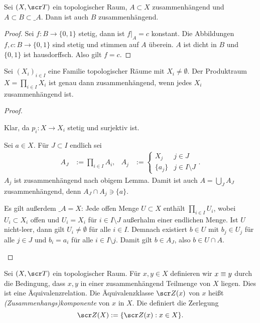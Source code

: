 \begin{lem}
	Sei $(X, \scr T)$ ein topologischer Raum, $A \subset X$ zusammenhängend und $A \subset B \subset \_A$.
	Dann ist auch $B$ zusammenhängend.
	\begin{proof}
		Sei $f: B \to \{0,1\}$ stetig, dann ist $f|_A = c$ konstant.
		Die Abbildungen $f, c: B \to \{0,1\}$ sind stetig und stimmen auf $A$ überein.
		$A$ ist dicht in $B$ und $\{0,1\}$ ist hausdorffsch.
		Also gilt $f=c$.
	\end{proof}
\end{lem}

\begin{st}
	Sei $(X_i)_{i\in I}$ eine Familie topologischer Räume mit $X_i \neq \emptyset$.
	Der Produktraum $X = \prod_{i\in I} X_i$ ist genau dann zusammenhängend, wenn jedes $X_i$ zusammenhängend ist.
	\begin{proof}
		\begin{segnb}[„$\implies$“]
			Klar, da $p_i: X \to X_i$ stetig und surjektiv ist.
		\end{segnb}
		\begin{segnb}[„$\implies$“]
			Sei $a \in X$.
			Für $J \subset I$ endlich sei
			\begin{align*}
				A_J &:= \prod_{i\in I} A_i, &
				A_j &:= \begin{cases}
					X_j & j \in J \\
					\{a_j\} & j \in I \setminus J
				\end{cases}.
			\end{align*}
			$A_j$ ist zusammenhängend nach obigem Lemma.
			Damit ist auch $A = \bigcup_{J} A_J$ zusammenhängend, denn $A_J \cap A_j \ni \{a\}$.

			Es gilt außerdem $\_A = X$:
			Jede offen Menge $U \subset X$ enthält $\prod_{i \in I} U_i$, wobei $U_i \subset X_i$ offen und $U_i = X_i$ für $i \in I \setminus J$ außerhalm einer endlichen Menge.
			Ist $U$ nicht-leer, dann gilt $U_i \neq \emptyset$ für alle $i \in I$.
			Demnach existiert $b \in U$ mit $b_j \in U_j$ für alle $j \in J$ und $b_i = a_i$ für alle $i \in I \setminus j$.
			Damit gilt $b \in A_J$, also $b \in U \cap A$.
		\end{segnb}
	\end{proof}
\end{st}

\begin{df}
	Sei $(X, \scr T)$ ein topologischer Raum.
	Für $x,y \in X$ definieren wir $x \equiv y$ durch die Bedingung, dass $x,y$ in einer zusammenhängend Teilmenge von $X$ liegen.
	Dies ist eine Äquivalenzrelation.
	Die Äquivalenzklasse $\scr Z(x)$ von $x$ heißt \emph{(Zusammenhangs)komponente} von $x$ in $X$.
	Die definiert die Zerlegung
	\[
		\scr Z(X) := \{ \scr Z(x) : x \in X \}.
	\]
\end{df}

